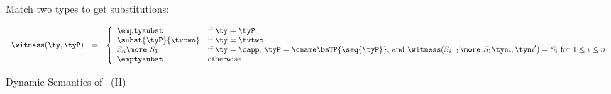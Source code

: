 \begin{figure}[htbp!]
Match two types to get substitutions: 

\[
\begin{array}{llll}
\witness(\ty, \tyP) & = & 
\left\{
\begin{array}{ll}
\emptysubst & \mbox{if } \ty = \tyP\\
\subst{\tyP}{\tvtwo} & \mbox{if } \ty = \tvtwo\\
S_n \more\ S_1 
& \mbox{if } \ty = \capp
\mbox{, } \tyP = \cname\bsTP{\seq{\tyP}}
\mbox{, and }
\witness(S_{i-1} \more\ S_1 \tyn i, {\tyn i}') = S_i
\mbox{ for }1\leq i\leq n\\
\emptysubst & \mbox{otherwise}
\end{array}
\right.
\end{array}
\]

\caption{Dynamic Semantics of \wherecore\ (II)}
\label{fig:where-dynamic2}
\end{figure}
